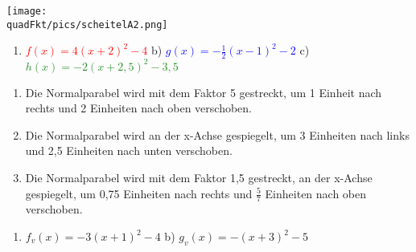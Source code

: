 \begin{Answer}[ref=scheitelformA2]
	
	\begin{minipage}{\linewidth}\centering
		\texttt{[image: \\quadFkt/pics/scheitelA2.png]}
	\end{minipage}\vspace{.1cm}
	\begin{enumerate}[label=\alph*)]
		\item \textcolor{red}{\(f(x)=4\left(x+2\right)^2-4\)}
		\quad b) \textcolor{blue}{\(g(x)=-\tfrac{1}{2}\left(x-1\right)^2-2\)} \quad c) \textcolor{ForestGreen}{\(h(x)=-2\left(x+2,5\right)^2-3,5\)}
	\end{enumerate}
\end{Answer}
\begin{Answer}[ref=scheitelformA3]
	
	\begin{enumerate}[label=\alph*)]
		\item Die Normalparabel wird mit dem Faktor 5 gestreckt, um 1 Einheit nach rechts und 2 Einheiten nach oben verschoben.
		\item Die Normalparabel wird an der x-Achse gespiegelt, um 3 Einheiten nach links und 2,5 Einheiten nach unten verschoben.
		\item Die Normalparabel wird mit dem Faktor 1,5 gestreckt, an der x-Achse gespiegelt, um 0,75 Einheiten nach rechts und \(\tfrac{5}{7}\) Einheiten nach oben verschoben.
	\end{enumerate}
\end{Answer}
\begin{Answer}[ref=scheitelformA4]
	
	\begin{enumerate}[label=\alph*)]
		\item \(f_v(x)=-3\left(x+1\right)^2-4\) \quad b) \(g_v(x)=-\left(x+3\right)^2-5\)
	\end{enumerate}
\end{Answer}\newpage